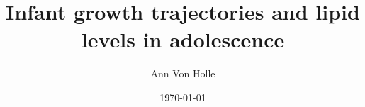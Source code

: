 
\title{Infant growth trajectories and lipid levels in adolescence}
\author{Ann Von Holle}
\date{\today}




\pagestyle{plain}

\frontmatter{}


\maketitlepg
\makecopyrightpage
\makeabstractpg

\clearpage


%

% 
\newlength{\oldbaselineskip}
\setlength{\oldbaselineskip}{\the\baselineskip}
\newlength{\oldparskip}
\setlength{\oldparskip}{\the\parskip}

% 
%

\setlength{\baselineskip}{0.5\oldbaselineskip}
\setlength{\parskip}{0.5\oldbaselineskip}



\tableofcontents
\newpage


